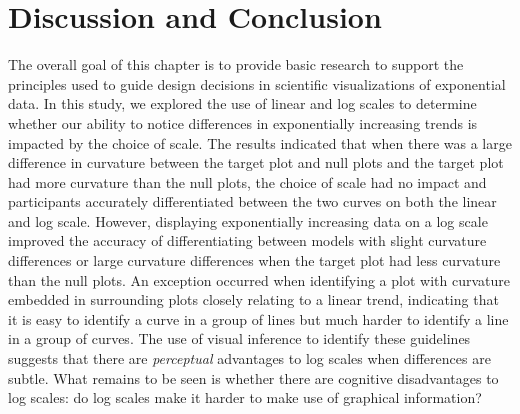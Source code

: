 \documentclass[12pt]{article}
\begin{document}
\hypertarget{discussion-and-conclusion}{%
\section{Discussion and Conclusion}\label{discussion-and-conclusion}}

The overall goal of this chapter is to provide basic research to support
the principles used to guide design decisions in scientific
visualizations of exponential data. In this study, we explored the use
of linear and log scales to determine whether our ability to notice
differences in exponentially increasing trends is impacted by the choice
of scale. The results indicated that when there was a large difference
in curvature between the target plot and null plots and the target plot
had more curvature than the null plots, the choice of scale had no
impact and participants accurately differentiated between the two curves
on both the linear and log scale. However, displaying exponentially
increasing data on a log scale improved the accuracy of differentiating
between models with slight curvature differences or large curvature
differences when the target plot had less curvature than the null plots.
An exception occurred when identifying a plot with curvature embedded in
surrounding plots closely relating to a linear trend, indicating that it
is easy to identify a curve in a group of lines but much harder to
identify a line in a group of curves. The use of visual inference to
identify these guidelines suggests that there are \emph{perceptual}
advantages to log scales when differences are subtle. What remains to be
seen is whether there are cognitive disadvantages to log scales: do log
scales make it harder to make use of graphical information?



\end{document}
